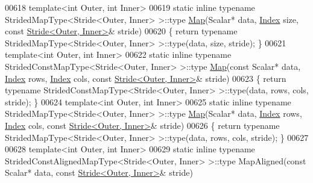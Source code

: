 \begin{DoxyCode}
00618     \textcolor{keyword}{template}<\textcolor{keywordtype}{int} Outer, \textcolor{keywordtype}{int} Inner>
00619     \textcolor{keyword}{static} \textcolor{keyword}{inline} \textcolor{keyword}{typename} StridedMapType<Stride<Outer, Inner> >::type \hyperlink{group___core___module_class_eigen_1_1_map}{Map}(Scalar* data, 
      \hyperlink{namespace_eigen_a62e77e0933482dafde8fe197d9a2cfde}{Index} size, \textcolor{keyword}{const} \hyperlink{group___core___module_class_eigen_1_1_stride}{Stride<Outer, Inner>}& stride)
00620     \{ \textcolor{keywordflow}{return} \textcolor{keyword}{typename} StridedMapType<Stride<Outer, Inner> >::type(data, size, stride); \}
00621     \textcolor{keyword}{template}<\textcolor{keywordtype}{int} Outer, \textcolor{keywordtype}{int} Inner>
00622     \textcolor{keyword}{static} \textcolor{keyword}{inline} \textcolor{keyword}{typename} StridedConstMapType<Stride<Outer, Inner> >::type \hyperlink{group___core___module_class_eigen_1_1_map}{Map}(\textcolor{keyword}{const} Scalar* data, 
      \hyperlink{namespace_eigen_a62e77e0933482dafde8fe197d9a2cfde}{Index} rows, \hyperlink{namespace_eigen_a62e77e0933482dafde8fe197d9a2cfde}{Index} cols, \textcolor{keyword}{const} \hyperlink{group___core___module_class_eigen_1_1_stride}{Stride<Outer, Inner>}& stride)
00623     \{ \textcolor{keywordflow}{return} \textcolor{keyword}{typename} StridedConstMapType<Stride<Outer, Inner> >::type(data, rows, cols, stride); \}
00624     \textcolor{keyword}{template}<\textcolor{keywordtype}{int} Outer, \textcolor{keywordtype}{int} Inner>
00625     \textcolor{keyword}{static} \textcolor{keyword}{inline} \textcolor{keyword}{typename} StridedMapType<Stride<Outer, Inner> >::type \hyperlink{group___core___module_class_eigen_1_1_map}{Map}(Scalar* data, 
      \hyperlink{namespace_eigen_a62e77e0933482dafde8fe197d9a2cfde}{Index} rows, \hyperlink{namespace_eigen_a62e77e0933482dafde8fe197d9a2cfde}{Index} cols, \textcolor{keyword}{const} \hyperlink{group___core___module_class_eigen_1_1_stride}{Stride<Outer, Inner>}& stride)
00626     \{ \textcolor{keywordflow}{return} \textcolor{keyword}{typename} StridedMapType<Stride<Outer, Inner> >::type(data, rows, cols, stride); \}
00627 
00628     \textcolor{keyword}{template}<\textcolor{keywordtype}{int} Outer, \textcolor{keywordtype}{int} Inner>
00629     \textcolor{keyword}{static} \textcolor{keyword}{inline} \textcolor{keyword}{typename} StridedConstAlignedMapType<Stride<Outer, Inner> >::type MapAligned(\textcolor{keyword}{const} Scalar*
       data, \textcolor{keyword}{const} \hyperlink{group___core___module_class_eigen_1_1_stride}{Stride<Outer, Inner>}& stride)

\end{DoxyCode}
